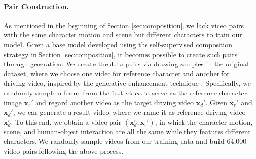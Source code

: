 

\paragraph{Pair Construction.}

As mentioned in the beginning of Section \ref{sec:composition}, we lack video pairs with the same character motion and scene but different characters to train our model.
Given a base model developed using the self-supervised composition strategy in Section \ref{sec:composition}, it becomes possible to create such pairs through generation.
We create the data pairs via drawing samples in the original dataset, where we choose one video for reference character and another for driving video, inspired by the generative enhancement technique \cite{zhu2024generative}. 
Specifically, we randomly sample a frame from the first video to serve as the reference character image $\boldsymbol{x}_r'$ and regard another video as the target driving video $\boldsymbol{x}_d'$.
Given $\boldsymbol{x}_r'$ and $\boldsymbol{x}_d'$, we can generate a result video, where we name it as reference driving video $\boldsymbol{x}_d^r$.
To this end, we obtain a video pair $(\boldsymbol{x}_d^r, \boldsymbol{x}_d')$, in which the character motion, scene, and human-object interaction are all the same while they features different characters.
We randomly sample videos from our training data and build 64,000 video pairs following the above process.

